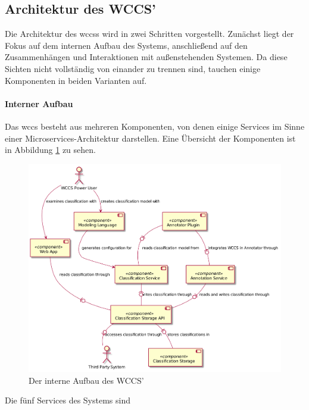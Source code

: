    \subsection{Architektur des WCCS'}
        \label{section:solutionConceptWCCSArch}
        Die Architektur des \glspl{wccs} wird in zwei Schritten vorgestellt.
        Zunächst liegt der Fokus auf dem internen Aufbau des Systems,
        anschließend auf den Zusammenhängen und Interaktionen mit außenstehenden Systemen.
        Da diese Sichten nicht vollständig von einander zu trennen sind,
        tauchen einige Komponenten in beiden Varianten auf.
        
        \paragraph{Interner Aufbau}
        Das \gls{wccs} besteht aus mehreren Komponenten,
        von denen einige Services im Sinne einer Microservices-Architektur darstellen.
        Eine Übersicht der Komponenten ist in Abbildung \ref{image:wccsInternalArchitecture} zu sehen.

        \begin{figure}
            \centering
            \includegraphics[scale=\imageScalingFactor]{../resources/architecture/wccs_internal_architecture.png}
            \caption{Der interne Aufbau des WCCS'}
            \label{image:wccsInternalArchitecture}
        \end{figure}

        Die fünf Services des Systems sind

